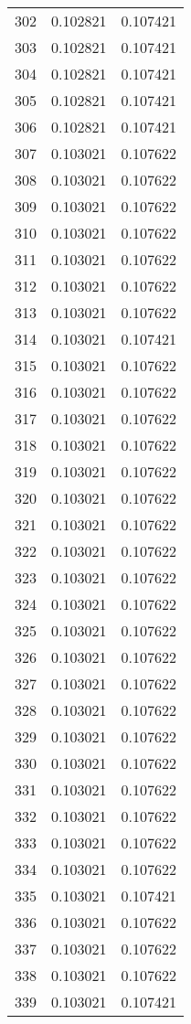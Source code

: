 \begin{longtable}{rrr}
302 & 0.102821 & 0.107421 \\
303 & 0.102821 & 0.107421 \\
304 & 0.102821 & 0.107421 \\
305 & 0.102821 & 0.107421 \\
306 & 0.102821 & 0.107421 \\
307 & 0.103021 & 0.107622 \\
308 & 0.103021 & 0.107622 \\
309 & 0.103021 & 0.107622 \\
310 & 0.103021 & 0.107622 \\
311 & 0.103021 & 0.107622 \\
312 & 0.103021 & 0.107622 \\
313 & 0.103021 & 0.107622 \\
314 & 0.103021 & 0.107421 \\
315 & 0.103021 & 0.107622 \\
316 & 0.103021 & 0.107622 \\
317 & 0.103021 & 0.107622 \\
318 & 0.103021 & 0.107622 \\
319 & 0.103021 & 0.107622 \\
320 & 0.103021 & 0.107622 \\
321 & 0.103021 & 0.107622 \\
322 & 0.103021 & 0.107622 \\
323 & 0.103021 & 0.107622 \\
324 & 0.103021 & 0.107622 \\
325 & 0.103021 & 0.107622 \\
326 & 0.103021 & 0.107622 \\
327 & 0.103021 & 0.107622 \\
328 & 0.103021 & 0.107622 \\
329 & 0.103021 & 0.107622 \\
330 & 0.103021 & 0.107622 \\
331 & 0.103021 & 0.107622 \\
332 & 0.103021 & 0.107622 \\
333 & 0.103021 & 0.107622 \\
334 & 0.103021 & 0.107622 \\
335 & 0.103021 & 0.107421 \\
336 & 0.103021 & 0.107622 \\
337 & 0.103021 & 0.107622 \\
338 & 0.103021 & 0.107622 \\
339 & 0.103021 & 0.107421 \\

\end{longtable}
